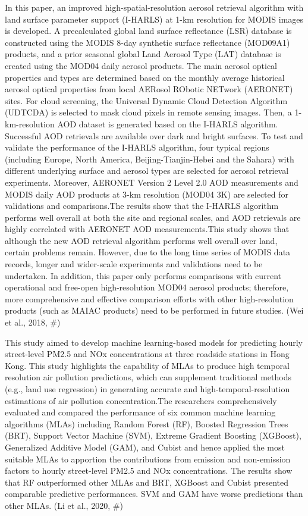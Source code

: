 In this paper, an improved high-spatial-resolution aerosol retrieval algorithm with land surface parameter support (I-HARLS) at 1-km resolution for MODIS images is developed. A precalculated global land surface reflectance (LSR) database is constructed using the MODIS 8-day synthetic surface reflectance (MOD09A1) products, and a prior seasonal global Land Aerosol Type (LAT) database is created using the MOD04 daily aerosol products. The main aerosol optical properties and types are determined based on the monthly average historical aerosol optical properties from local AERosol RObotic NETwork (AERONET) sites. For cloud screening, the Universal Dynamic Cloud Detection Algorithm (UDTCDA) is selected to mask cloud pixels in remote sensing images. Then, a 1-km-resolution AOD dataset is generated based on the I-HARLS algorithm. Successful AOD retrievals are available over dark and bright surfaces. To test and validate the performance of the I-HARLS algorithm, four typical regions (including Europe, North America, Beijing-Tianjin-Hebei and the Sahara) with different underlying surface and aerosol types are selected for aerosol retrieval experiments. Moreover, AERONET Version 2 Level 2.0 AOD measurements and MODIS daily AOD products at 3-km resolution (MOD04 3K) are selected for validations and comparisons.The results show that the I-HARLS algorithm performs well overall at both the site and regional scales, and AOD retrievals are highly correlated with AERONET AOD measurements.This study shows that although the new AOD retrieval algorithm performs well overall over land, certain problems remain. However, due to the long time series of MODIS data records, longer and wider-scale experiments and validations need to be undertaken. In addition, this paper only performs comparisons with current operational and free-open high-resolution MOD04 aerosol products; therefore, more comprehensive and effective comparison efforts with other high-resolution products (such as MAIAC products) need to be performed in future studies. (Wei et al., 2018, #)

This study aimed to develop machine learning-based models for predicting hourly street-level PM2.5 and NOx concentrations at three roadside stations in Hong Kong. This study highlights the capability of MLAs to produce high temporal resolution air pollution predictions, which can supplement traditional methods (e.g., land use regression) in generating accurate and high-temporal-resolution estimations of air pollution concentration.The researchers comprehensively evaluated and compared the performance of six common machine learning algorithms (MLAs) including Random Forest (RF), Boosted Regression Trees (BRT), Support Vector Machine (SVM), Extreme Gradient Boosting (XGBoost), Generalized Additive Model (GAM), and Cubist and hence applied the most suitable MLAs to apportion the contributions from emission and non-emission factors to hourly street-level PM2.5 and NOx concentrations. The results show that RF outperformed other MLAs and BRT, XGBoost and Cubist presented comparable predictive performances. SVM and GAM have worse predictions than other MLAs. (Li et al., 2020, #)

 

